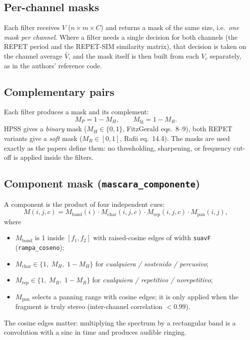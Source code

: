 \documentclass[11pt,a4paper]{article}
\newcommand{\code}[1]{\texttt{#1}}
\begin{document}
\subsection{Per-channel masks}
Each filter receives $V$ ($n\times m\times C$) and returns a mask of the
same size, i.e.\ \emph{one mask per channel}. Where a filter needs a single
decision for both channels (the REPET period and the REPET-SIM similarity
matrix), that decision is taken on the channel average $\bar V$, and the
mask itself is then built from each $V_c$ separately, as in the authors'
reference code.

\subsection{Complementary pairs}
Each filter produces a mask and its complement:
\begin{equation}
  M_P = 1-M_H, \qquad M_{\text{fg}} = 1-M_R .
\end{equation}
HPSS gives a \emph{binary} mask ($M_H\in\{0,1\}$, FitzGerald eqs.~8--9),
both REPET variants give a \emph{soft} mask ($M_R\in[0,1]$, Rafii eq.~14.4).
The masks are used exactly as the papers define them: no thresholding,
sharpening, or frequency cut-off is applied inside the filters.

\subsection{Component mask (\code{mascara\_componente})}
A component is the product of four independent cues:
\begin{equation}
  M(i,j,c) = M_{\text{band}}(i)\cdot M_{\text{char}}(i,j,c)\cdot
             M_{\text{rep}}(i,j,c)\cdot M_{\text{pan}}(i,j),
  \label{eq:component}
\end{equation}
where
\begin{itemize}[nosep]
  \item $M_{\text{band}}$ is 1 inside $[f_1,f_2]$ with raised-cosine
        edges of width \code{suavF} (\code{rampa\_coseno});
  \item $M_{\text{char}}\in\{1,\;M_H,\;1-M_H\}$ for
        \emph{cualquiera / sostenido / percusivo};
  \item $M_{\text{rep}}\in\{1,\;M_R,\;1-M_R\}$ for
        \emph{cualquiera / repetitivo / norepetitivo};
  \item $M_{\text{pan}}$ selects a panning range with cosine edges; it is
        only applied when the fragment is truly stereo (inter-channel
        correlation $<0.99$).
\end{itemize}
The cosine edges matter: multiplying the spectrum by a rectangular band is
a convolution with a sinc in time and produces audible ringing.
\end{document}
